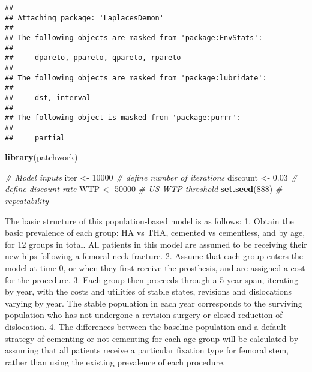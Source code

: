 \documentclass[
]{article}
\newenvironment{Shaded}{\begin{snugshade}}{\end{snugshade}}
\newcommand{\CommentTok}[1]{\textcolor[rgb]{0.56,0.35,0.01}{\textit{#1}}}
\newcommand{\DecValTok}[1]{\textcolor[rgb]{0.00,0.00,0.81}{#1}}
\newcommand{\FloatTok}[1]{\textcolor[rgb]{0.00,0.00,0.81}{#1}}
\newcommand{\FunctionTok}[1]{\textcolor[rgb]{0.13,0.29,0.53}{\textbf{#1}}}
\newcommand{\NormalTok}[1]{#1}
\newcommand{\OtherTok}[1]{\textcolor[rgb]{0.56,0.35,0.01}{#1}}
\begin{document}
\begin{verbatim}
## 
## Attaching package: 'LaplacesDemon'
## 
## The following objects are masked from 'package:EnvStats':
## 
##     dpareto, ppareto, qpareto, rpareto
## 
## The following objects are masked from 'package:lubridate':
## 
##     dst, interval
## 
## The following object is masked from 'package:purrr':
## 
##     partial
\end{verbatim}

\begin{Shaded}
\begin{Highlighting}[]
\FunctionTok{library}\NormalTok{(patchwork)}

\CommentTok{\# Model inputs}
\NormalTok{iter }\OtherTok{\textless{}{-}} \DecValTok{10000} \CommentTok{\# define number of iterations}
\NormalTok{discount }\OtherTok{\textless{}{-}} \FloatTok{0.03} \CommentTok{\# define discount rate}
\NormalTok{WTP }\OtherTok{\textless{}{-}} \DecValTok{50000} \CommentTok{\# US WTP threshold}
\FunctionTok{set.seed}\NormalTok{(}\DecValTok{888}\NormalTok{) }\CommentTok{\# repeatability}
\end{Highlighting}
\end{Shaded}

The basic structure of this population-based model is as follows: 1.
Obtain the basic prevalence of each group: HA vs THA, cemented vs
cementless, and by age, for 12 groups in total. All patients in this
model are assumed to be receiving their new hips following a femoral
neck fracture. 2. Assume that each group enters the model at time 0, or
when they first receive the prosthesis, and are assigned a cost for the
procedure. 3. Each group then proceeds through a 5 year span, iterating
by year, with the costs and utilities of stable states, revisions and
dislocations varying by year. The stable population in each year
corresponds to the surviving population who has not undergone a revision
surgery or closed reduction of dislocation. 4. The differences between
the baseline population and a default strategy of cementing or not
cementing for each age group will be calculated by assuming that all
patients receive a particular fixation type for femoral stem, rather
than using the existing prevalence of each procedure.
\end{document}
